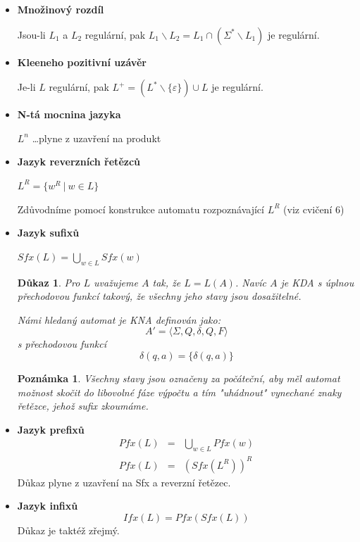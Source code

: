 \documentclass[10pt, a4paper, titlepage]{article}
\theoremstyle{note}
\newtheorem{dukaz}{Důkaz}
\newtheorem{poznamka}{Poznámka}
\begin{document}
\begin{itemize}

\item
\textbf{Množinový rozdíl}

Jsou-li $L_1$ a $L_2$ regulární, pak $L_1 \backslash L_2 = L_1 \cap (\Sigma^* \backslash L_1)$ je regulární.

\item
\textbf{Kleeneho pozitivní uzávěr}

Je-li $L$ regulární, pak $L^+ = (L^* \backslash \lbrace \varepsilon \rbrace) \cup L$ je regulární.

\item
\textbf{N-tá mocnina jazyka}

$L^n$ \ldots plyne z uzavření na produkt

\item
\textbf{Jazyk reverzních řetězců}

$L^R = \lbrace w^R \ |\ w \in L \rbrace$

Zdůvodníme pomocí konstrukce automatu rozpoznávající $L^R$ (viz cvičení 6) 

\item
\textbf{Jazyk sufixů}

$Sfx(L) = \bigcup_{w \in L} Sfx(w)$

\begin{dukaz}
Pro $L$ uvažujeme $A$ tak, že $L = L(A)$. Navíc $A$ je KDA s úplnou přechodovou funkcí takový, že všechny jeho stavy jsou dosažitelné.

Námi hledaný automat je KNA definován jako:
$$A' = \langle \Sigma,Q,\delta,Q,F \rangle$$
s přechodovou funkcí
$$\delta(q,a) = \lbrace \delta(q,a) \rbrace$$
\end{dukaz}
\begin{poznamka}
Všechny stavy jsou označeny za počáteční, aby měl automat možnost skočit do libovolné fáze výpočtu a tím "uhádnout" vynechané znaky řetězce, jehož sufix zkoumáme.
\end{poznamka}

\item
\textbf{Jazyk prefixů}
\begin{eqnarray*}
Pfx(L) &=& \bigcup_{w \in L} Pfx(w) \\
Pfx(L) &=& (Sfx(L^R))^R
\end{eqnarray*}
Důkaz plyne z uzavření na Sfx a reverzní řetězec.

\item
\textbf{Jazyk infixů}
$$
Ifx(L) = Pfx(Sfx(L))
$$
Důkaz je taktéž zřejmý.
\end{itemize}
\end{document}
